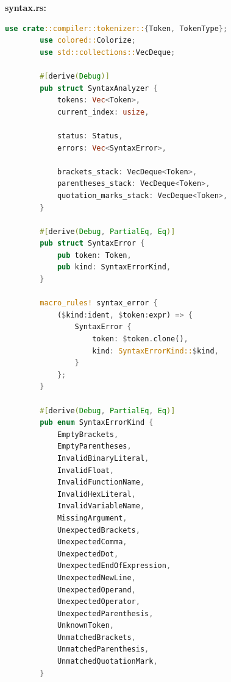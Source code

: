 \documentclass[14pt, a4paper]{extreport}
\begin{document}
	\bigskip
	
	\textbf{syntax.rs:}
	
	\begin{lstlisting}[language=Rust]
		use crate::compiler::tokenizer::{Token, TokenType};
		use colored::Colorize;
		use std::collections::VecDeque;
		
		#[derive(Debug)]
		pub struct SyntaxAnalyzer {
			tokens: Vec<Token>,
			current_index: usize,
			
			status: Status,
			errors: Vec<SyntaxError>,
			
			brackets_stack: VecDeque<Token>,
			parentheses_stack: VecDeque<Token>,
			quotation_marks_stack: VecDeque<Token>,
		}
		
		#[derive(Debug, PartialEq, Eq)]
		pub struct SyntaxError {
			pub token: Token,
			pub kind: SyntaxErrorKind,
		}
		
		macro_rules! syntax_error {
			($kind:ident, $token:expr) => {
				SyntaxError {
					token: $token.clone(),
					kind: SyntaxErrorKind::$kind,
				}
			};
		}
		
		#[derive(Debug, PartialEq, Eq)]
		pub enum SyntaxErrorKind {
			EmptyBrackets,
			EmptyParentheses,
			InvalidBinaryLiteral,
			InvalidFloat,
			InvalidFunctionName,
			InvalidHexLiteral,
			InvalidVariableName,
			MissingArgument,
			UnexpectedBrackets,
			UnexpectedComma,
			UnexpectedDot,
			UnexpectedEndOfExpression,
			UnexpectedNewLine,
			UnexpectedOperand,
			UnexpectedOperator,
			UnexpectedParenthesis,
			UnknownToken,
			UnmatchedBrackets,
			UnmatchedParenthesis,
			UnmatchedQuotationMark,
		}
		

\end{lstlisting}
\end{document}
